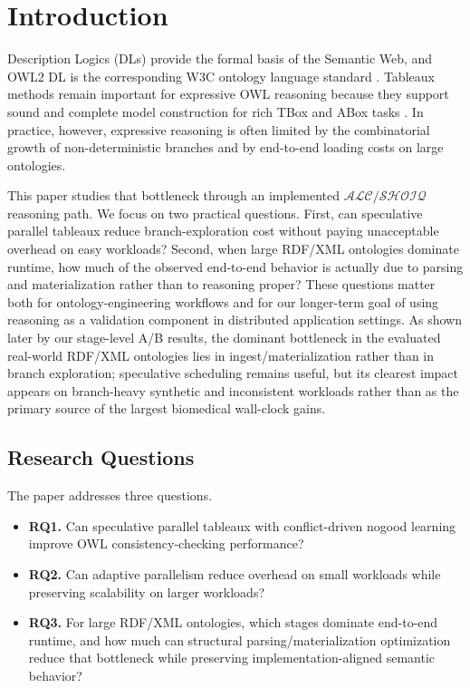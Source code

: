 \documentclass[preprint,12pt,times]{elsarticle}
\newcommand{\dlfrag}{\ensuremath{\mathcal{ALC/SHOIQ}}}
\begin{document}
\section{Introduction}
\label{sec:intro}

Description Logics (DLs) provide the formal basis of the Semantic Web, and OWL2 DL is the corresponding W3C ontology language standard \cite{owl2}. Tableaux methods remain important for expressive OWL reasoning because they support sound and complete model construction for rich TBox and ABox tasks \cite{dlhandbook}. In practice, however, expressive reasoning is often limited by the combinatorial growth of non-deterministic branches and by end-to-end loading costs on large ontologies.

This paper studies that bottleneck through an implemented \dlfrag reasoning path. We focus on two practical questions. First, can speculative parallel tableaux reduce branch-exploration cost without paying unacceptable overhead on easy workloads? Second, when large RDF/XML ontologies dominate runtime, how much of the observed end-to-end behavior is actually due to parsing and materialization rather than to reasoning proper? These questions matter both for ontology-engineering workflows and for our longer-term goal of using reasoning as a validation component in distributed application settings. As shown later by our stage-level A/B results, the dominant bottleneck in the evaluated real-world RDF/XML ontologies lies in ingest/materialization rather than in branch exploration; speculative scheduling remains useful, but its clearest impact appears on branch-heavy synthetic and inconsistent workloads rather than as the primary source of the largest biomedical wall-clock gains.

\subsection{Research Questions}
\label{sec:questions}

The paper addresses three questions.
\begin{itemize}
    \item \textbf{RQ1.} Can speculative parallel tableaux with conflict-driven nogood learning improve OWL consistency-checking performance?
    \item \textbf{RQ2.} Can adaptive parallelism reduce overhead on small workloads while preserving scalability on larger workloads?
    \item \textbf{RQ3.} For large RDF/XML ontologies, which stages dominate end-to-end runtime, and how much can structural parsing/materialization optimization reduce that bottleneck while preserving implementation-aligned semantic behavior?
\end{itemize}
\end{document}
